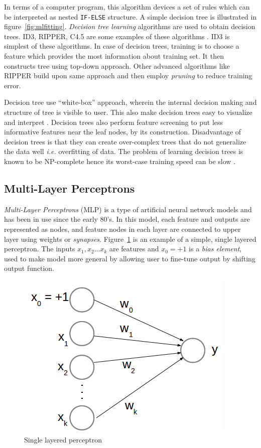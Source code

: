 In terms of a computer program, this algorithm devices a set of rules which can be interpreted as nested \texttt{IF-ELSE} structure. A simple decision tree is illustrated in figure~\ref{fig:mlfitting}. \emph{Decision tree learning} algorithms are used to obtain decision trees. ID3, RIPPER, C4.5 are some examples of these algorithms \cite{Mitchell1997}. ID3 \cite{Quinlan1986} is simplest of these algorithms. In case of decision trees, training is to choose a feature which provides the most information about training set. It then constructs tree using top-down approach. Other advanced algorithms like RIPPER \cite{Cohen1995} build upon same approach and then employ \emph{pruning} to reduce training error.

Decision tree use \enquote{white-box} approach, wherein the internal decision making and structure of tree is visible to user. This also make decision trees easy to visualize and interpret \cite{Kotsiantis2013}. Decision trees also perform feature screening to put less informative features near the leaf nodes, by its construction. Disadvantage of decision trees is that they can create over-complex trees that do not generalize the data well \emph{i.e.} overfitting of data. The problem of learning decision trees is known to be NP-complete hence its worst-case training speed can be slow \cite{Hyafil1976}.

\subsection{Multi-Layer Perceptrons}
\emph{Multi-Layer Perceptrons} (MLP) is a type of artificial neural network models and has been in use since the early 80's. In this model, each feature and outputs are represented as nodes, and feature nodes in each layer are connected to upper layer using weights or \emph{synapses}. Figure~\ref{fig:perceptron} is an example of a simple, single layered perceptron. The inputs $x_1, x_2 \ldots x_k$ are features and $x_0 = +1$ is a \emph{bias element}, used to make model more general by allowing user to fine-tune output by shifting output function.

\begin{figure}[h]
  \begin{center}
    \captionsetup{justification=centering}
    \includegraphics[scale=0.45]{figures/perceptron.png}
    \caption{Single layered perceptron}
    \label{fig:perceptron}
  \end{center}
\end{figure}

